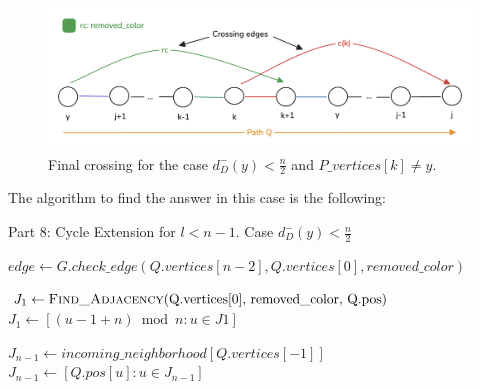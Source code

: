 \begin{figure}[H]
    \centering
    \includegraphics[width=1\textwidth]{figuras/cycle_n-1_last_crossing.png}
    \caption{Final crossing for the case $d^-_D(y) < \frac{n}{2}$ and $P\_vertices[k] \neq y$.}
    \label{fig:cycle_n-1_last_crossing}
\end{figure}

The algorithm to find the answer in this case is the following:

\begin{algorithm}[H]
    \caption{Part 8: Cycle Extension for \( l < n - 1 \). Case \( d^-_D(y) < \frac{n}{2} \)}
    \begin{algorithmic}[1]
            \State $edge \gets G.check\_edge(Q.vertices[n - 2], Q.vertices[0], removed\_color)$
                \State \Return {}
            \EndIf

            \State $J_1 \gets \Call{Find\_Adjacency}{$Q.vertices[0], removed\_color, Q.pos$}$
            \State $J_1 \gets [(u - 1 + n) \bmod n : u \in J1]$

            \State $J_{n-1} \gets incoming\_neighborhood[Q.vertices[-1]]$
            \State $J_{n-1} \gets [Q.pos[u] : u \in J_{n-1}]$
        \EndFunction
    \end{algorithmic}
\end{algorithm}
